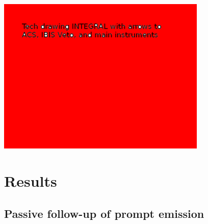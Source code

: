 \documentclass[a0,portrait]{a0poster}
\begin{document}
\begin{multicols}{2}
\begin{center}
    \includegraphics[width=10cm]{figures/INTEGRAL.png}
\end{center}

\section*{Results}

\subsection*{Passive follow-up of prompt emission}


\end{multicols}
\end{document}
